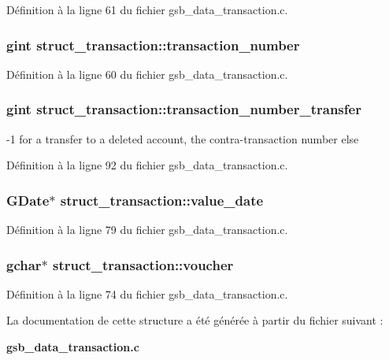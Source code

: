 Définition à la ligne 61 du fichier gsb\_\-data\_\-transaction.c.

\subsubsection[{transaction\_\-number}]{\setlength{\rightskip}{0pt plus 5cm}gint {\bf struct\_\-transaction::transaction\_\-number}}\label{structstruct__transaction_a3f9278776e0b002c6a2837c2b3d4f97e}


Définition à la ligne 60 du fichier gsb\_\-data\_\-transaction.c.

\subsubsection[{transaction\_\-number\_\-transfer}]{\setlength{\rightskip}{0pt plus 5cm}gint {\bf struct\_\-transaction::transaction\_\-number\_\-transfer}}\label{structstruct__transaction_ab411ca85b22e0ca411ba0bf511f0924d}
-\/1 for a transfer to a deleted account, the contra-\/transaction number else 

Définition à la ligne 92 du fichier gsb\_\-data\_\-transaction.c.

\subsubsection[{value\_\-date}]{\setlength{\rightskip}{0pt plus 5cm}GDate$\ast$ {\bf struct\_\-transaction::value\_\-date}}\label{structstruct__transaction_a75ff7fda8398391139583e7187c13242}


Définition à la ligne 79 du fichier gsb\_\-data\_\-transaction.c.

\subsubsection[{voucher}]{\setlength{\rightskip}{0pt plus 5cm}gchar$\ast$ {\bf struct\_\-transaction::voucher}}\label{structstruct__transaction_aa0861a5055975fe5b6feac4934992aeb}


Définition à la ligne 74 du fichier gsb\_\-data\_\-transaction.c.



La documentation de cette structure a été générée à partir du fichier suivant :\begin{DoxyCompactItemize}
\item 
{\bf gsb\_\-data\_\-transaction.c}\end{DoxyCompactItemize}
